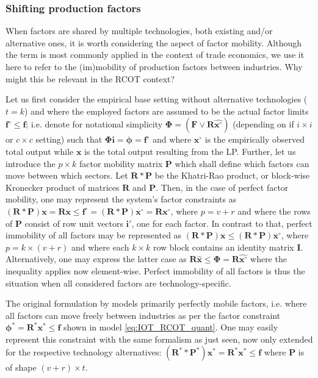 \subsubsection{Shifting production factors}

When factors are shared by multiple technologies, both existing and/or alternative ones, it is worth considering the aspect of factor mobility. Although the term is most commonly applied in the context of trade economics, we use it here to refer to the (im)mobility of production factors between industries. Why might this be relevant in the RCOT context? 

Let us first consider the empirical base setting without alternative technologies ($t = k$) and where the employed factors are assumed to be the actual factor limits $\bm{f}^{\circ} \le \bm{f}$; i.e. denote for notational simplicity $\bm{\Phi} = (\bm{F} \lor \bm{R} \widehat{\bm{x}^{\circ}})$ (depending on if $i \times i$ or $c \times c$ setting) such that $\bm{\Phi i} = \bm{\phi} = \bm{f}^{\circ}$ and where $\bm{x}^{\circ}$ is the empirically observed total output while $\bm{x}$ is the total output resulting from the LP. Further, let us introduce the $p \times k$ factor mobility matrix $\bm{P}$ which shall define which factors can move between which sectors. Let $\bm{R} \ast \bm{P}$ be the Khatri-Rao product, or block-wise Kronecker product of matrices $\bm{R}$ and $\bm{P}$. Then, in the case of perfect factor mobility, one may represent the system's factor constraints as $(\bm{R} \ast \bm{P}) \bm{x} = \bm{R} \bm{x} \le \bm{f}^{\circ} = (\bm{R} \ast \bm{P}) \bm{x}^{\circ} = \bm{R} \bm{x}^{\circ}$, where $p = v + r$ and where the rows of $\bm{P}$ consist of row unit vectors $\bm{i}'$, one for each factor. In contrast to that, perfect immobility of all factors may be represented as $(\bm{R} \ast \bm{P}) \bm{x} \le (\bm{R} \ast \bm{P}) \bm{x}^{\circ}$, where $p = k \times (v + r)$ and where each $k \times k$ row block contains an identity matrix $\bm{I}$. Alternatively, one may express the latter case as $\bm{R} \widehat{\bm{x}} \le \bm{\Phi} = \bm{R} \widehat{\bm{x}^{\circ}}$ where the inequality applies now element-wise. Perfect immobility of all factors is thus the situation when all considered factors are technology-specific.

The original formulation by \textcite{duchin_2011} models primarily perfectly mobile factors, i.e. where all factors can move freely between industries as per the factor constraint $\bm{\phi}^{*} = \bm{R}^{*} \bm{x}^{*} \le \bm{f}$ shown in model \ref{eq:IOT_RCOT_quant}\footnotemark{}. One may easily represent this constraint with the same formalism as just seen, now only extended for the respective technology alternatives: $(\bm{R}^{*} \ast \bm{P}^{*}) \bm{x}^{*} = \bm{R}^{*} \bm{x}^{*} \le \bm{f}$ where $\bm{P}$ is of shape $(v + r) \times t$.

